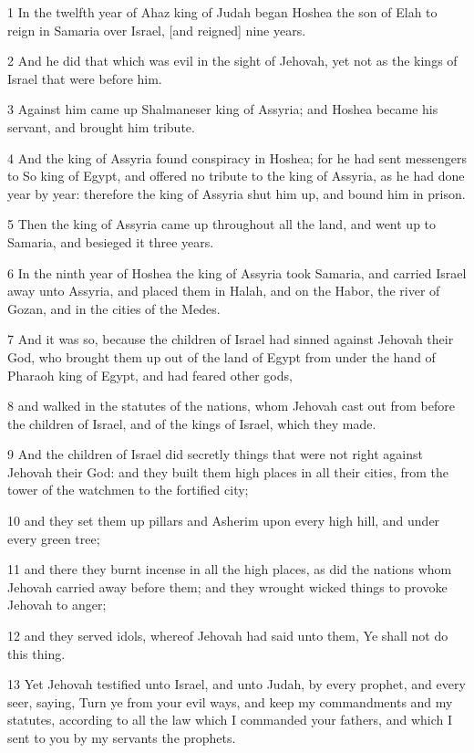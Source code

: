 \par 1 In the twelfth year of Ahaz king of Judah began Hoshea the son of Elah to reign in Samaria over Israel, [and reigned] nine years.
\par 2 And he did that which was evil in the sight of Jehovah, yet not as the kings of Israel that were before him.
\par 3 Against him came up Shalmaneser king of Assyria; and Hoshea became his servant, and brought him tribute.
\par 4 And the king of Assyria found conspiracy in Hoshea; for he had sent messengers to So king of Egypt, and offered no tribute to the king of Assyria, as he had done year by year: therefore the king of Assyria shut him up, and bound him in prison.
\par 5 Then the king of Assyria came up throughout all the land, and went up to Samaria, and besieged it three years.
\par 6 In the ninth year of Hoshea the king of Assyria took Samaria, and carried Israel away unto Assyria, and placed them in Halah, and on the Habor, the river of Gozan, and in the cities of the Medes.
\par 7 And it was so, because the children of Israel had sinned against Jehovah their God, who brought them up out of the land of Egypt from under the hand of Pharaoh king of Egypt, and had feared other gods,
\par 8 and walked in the statutes of the nations, whom Jehovah cast out from before the children of Israel, and of the kings of Israel, which they made.
\par 9 And the children of Israel did secretly things that were not right against Jehovah their God: and they built them high places in all their cities, from the tower of the watchmen to the fortified city;
\par 10 and they set them up pillars and Asherim upon every high hill, and under every green tree;
\par 11 and there they burnt incense in all the high places, as did the nations whom Jehovah carried away before them; and they wrought wicked things to provoke Jehovah to anger;
\par 12 and they served idols, whereof Jehovah had said unto them, Ye shall not do this thing.
\par 13 Yet Jehovah testified unto Israel, and unto Judah, by every prophet, and every seer, saying, Turn ye from your evil ways, and keep my commandments and my statutes, according to all the law which I commanded your fathers, and which I sent to you by my servants the prophets.
